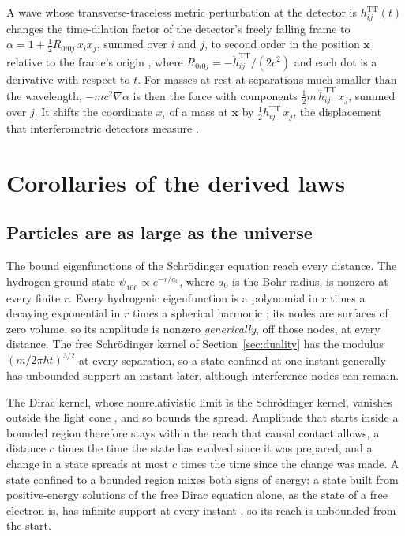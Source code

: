 \documentclass[aps,prd,onecolumn,tightenlines,nofootinbib,notitlepage,11pt,floatfix]{revtex4-2}
\theoremstyle{indentedtheorem}
\begin{document}
A wave whose transverse-traceless metric perturbation at the detector is $h^\text{TT}_{ij}(t)$ changes the time-dilation factor of the detector's freely falling frame to $\alpha=1+\tfrac{1}{2}R_{0i0j}\,x_ix_j$, summed over $i$ and $j$, to second order in the position $\mathbf{x}$ relative to the frame's origin \citep{Rakhmanov2014Fermi}, where $R_{0i0j}=-\ddot{h}^\text{TT}_{ij}/(2c^2)$ and each dot is a derivative with respect to $t$. For masses at rest at separations much smaller than the wavelength, $-mc^2\nabla\alpha$ is then the force with components $\tfrac{1}{2}m\,\ddot{h}^\text{TT}_{ij}\,x_j$, summed over $j$. It shifts the coordinate $x_i$ of a mass at $\mathbf{x}$ by $\tfrac{1}{2}h^\text{TT}_{ij}\,x_j$, the displacement that interferometric detectors measure \citep{Flanagan2005Basics}.

\section{Corollaries of the derived laws}
\label{sec:discussion}

\subsection{Particles are as large as the universe}
\label{sec:reach}

The bound eigenfunctions of the Schr\"odinger equation reach every distance. The hydrogen ground state $\psi_{100}\propto e^{-r/a_0}$, where $a_0$ is the Bohr radius, is nonzero at every finite $r$. Every hydrogenic eigenfunction is a polynomial in $r$ times a decaying exponential in $r$ times a spherical harmonic \citep{Sakurai2020Modern}; its nodes are surfaces of zero volume, so its amplitude is nonzero \emph{generically}, off those nodes, at every distance. The free Schr\"odinger kernel of Section~\ref{sec:duality} has the modulus $(m/2\pi\hbar t)^{3/2}$ at every separation, so a state confined at one instant generally has unbounded support an instant later, although interference nodes can remain.

The Dirac kernel, whose nonrelativistic limit is the Schr\"odinger kernel, vanishes outside the light cone \citep{Thaller1992Dirac}, and so bounds the spread. Amplitude that starts inside a bounded region therefore stays within the reach that causal contact allows, a distance $c$ times the time the state has evolved since it was prepared, and a change in a state spreads at most $c$ times the time since the change was made. A state confined to a bounded region mixes both signs of energy: a state built from positive-energy solutions of the free Dirac equation alone, as the state of a free electron is, has infinite support at every instant \citep{Hegerfeldt1998Instantaneous}, so its reach is unbounded from the start.
\end{document}
